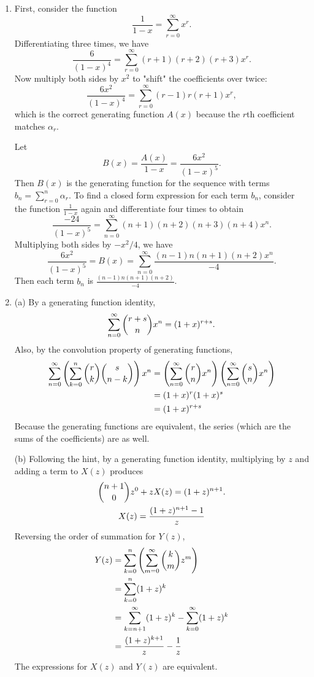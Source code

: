 \documentclass[a4paper, 12pt]{article}
\begin{document}
\begin{enumerate}
		\item First, consider the function
		\[ \frac{1}{1 - x} = \sum_{r = 0}^{\infty}x^r. \]
		Differentiating three times, we have
		\[ \frac{6}{(1 - x)^4} = \sum_{r = 0}^{\infty}(r + 1)(r + 2)(r + 3)x^r. \]
		Now multiply both sides by $x^2$ to "shift" the coefficients over twice:
		\[ \frac{6x^2}{(1 - x)^4} = \sum_{r = 0}^{\infty}(r - 1)r(r + 1)x^r, \]
		which is the correct generating function $A(x)$ because the $r$th coefficient matches $\alpha_r$. \par
		Let
		\[ B(x) = \frac{A(x)}{1 - x} = \frac{6x^2}{(1 - x)^5}. \]
		Then $B(x)$ is the generating function for the sequence with terms $b_n = \sum_{r = 0}^{n}\alpha_r$. To find a closed form expression for each term $b_n$, consider the function $\frac{1}{1 - x}$ again and differentiate four times to obtain
		\[ \frac{-24}{(1 - x)^5} = \sum_{n = 0}^{\infty}(n + 1)(n + 2)(n + 3)(n + 4)x^n. \]
		Multiplying both sides by $-x^2 / 4$, we have
		\[ \frac{6x^2}{(1 - x)^5} = B(x) = \sum_{n = 0}^{\infty} \frac{(n - 1)n(n + 1)(n + 2)x^n}{-4}. \]
		Then each term $b_n$ is $\frac{(n - 1)n(n + 1)(n + 2)}{-4}$.

		\item (a) By a generating function identity,
		\[ \sum_{n = 0}^{\infty} \dbinom{r + s}{n}x^n = (1 + x)^{r + s}. \]
		Also, by the convolution property of generating functions,
		\begin{align*}
		\sum_{n = 0}^{\infty} \left( \sum_{k = 0}^{n} \dbinom{r}{k}\dbinom{s}{n - k} \right)x^n &= \left( \sum_{n = 0}^{\infty}\dbinom{r}{n}x^n \right)\left( \sum_{n = 0}^{\infty}\dbinom{s}{n}x^n \right) \\
		&= (1 + x)^r(1 + x)^s \\
		&= (1 + x)^{r + s}
		\end{align*}
		Because the generating functions are equivalent, the series (which are the sums of the coefficients) are as well. \par
		(b) Following the hint, by a generating function identity, multiplying by $z$ and adding a term to $X(z)$ produces
		\begin{gather*}
		\dbinom{n + 1}{0}z^0 + zX(z) = (1 + z)^{n + 1}. \\
		X(z) = \frac{(1 + z)^{n + 1} - 1}{z}
		\end{gather*}
		Reversing the order of summation for $Y(z)$,
		\begin{align*}
		Y(z) &= \sum_{k = 0}^{n}\left( \sum_{m = 0}^{\infty}\dbinom{k}{m}z^m \right) \\
		&= \sum_{k = 0}^{n}(1 + z)^k \\
		&= \sum_{k = n + 1}^{\infty}(1 + z)^k - \sum_{k = 0}^{\infty}(1 + z)^k \\
		&= \frac{(1 + z)^{k + 1}}{z} - \frac{1}{z}
		\end{align*}
		The expressions for $X(z)$ and $Y(z)$ are equivalent.
	\end{enumerate}
\end{document}
